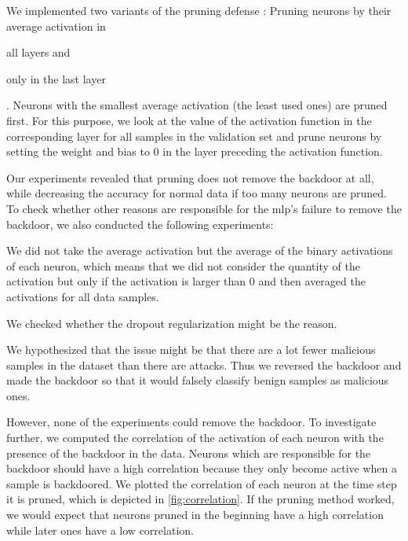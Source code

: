 \documentclass[10pt,sigconf,letterpaper,dvipsnames]{acmart}
\begin{document}
We implemented two variants of the pruning defense \cite{gu_badnets:_2017}: Pruning neurons by their average activation in \begin{enumerate*}\item all layers and \item only in the last layer \end{enumerate*}. Neurons with the smallest average activation (the least used ones) are pruned first. For this purpose, we look at the value of the activation function
in the corresponding layer for all samples in the validation set and prune neurons by setting the weight and bias to 0 in the layer preceding the activation function.

Our experiments revealed that pruning does not remove the backdoor at all, while decreasing the accuracy for normal data if too many neurons are pruned. To check whether other reasons are responsible for the \gls{mlp}'s failure to remove the backdoor, we also conducted the following experiments: \begin{enumerate*} \item We did not take the average activation but the average of the binary activations of each neuron, which means that we did not consider the quantity of the activation but only if the activation is larger than 0 and then averaged the activations for all data samples. \item We checked whether the dropout regularization might be the reason. \item We hypothesized that the issue might be that there are a lot fewer malicious samples in the dataset than there are attacks. Thus we reversed the backdoor and made the backdoor so that it would falsely classify benign samples as malicious ones.
\end{enumerate*}

However, none of the experiments could remove the backdoor.
To investigate further, we computed the correlation of the activation of each neuron with the presence of the backdoor in the data. Neurons which are responsible for the backdoor should have a high correlation because they only become active when a sample is backdoored. We  plotted the correlation of each neuron at the time step it is pruned, which is depicted in \autoref{fig:correlation}. If the pruning method worked, we would expect
that neurons pruned in the beginning have a high correlation while later ones have a low correlation.
\end{document}
